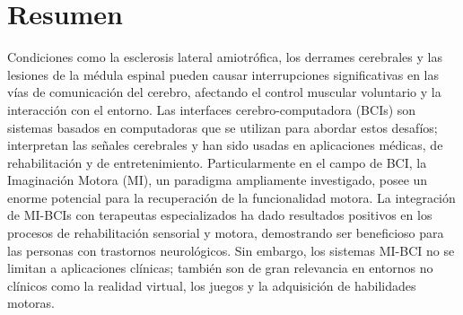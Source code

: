 \newpage
\chapter*{\sffamily Resumen}
%
\par Condiciones como la esclerosis lateral amiotrófica, los derrames cerebrales y las lesiones de la médula espinal pueden causar interrupciones significativas en las vías de comunicación del cerebro, afectando el control muscular voluntario y la interacción con el entorno. Las interfaces cerebro-computadora (BCIs) son sistemas basados en computadoras que se utilizan para abordar estos desafíos; interpretan las señales cerebrales y han sido usadas en aplicaciones médicas, de rehabilitación y de entretenimiento. Particularmente en el campo de BCI, la Imaginación Motora (MI), un paradigma ampliamente investigado, posee un enorme potencial para la recuperación de la funcionalidad motora. La integración de MI-BCIs con terapeutas especializados ha dado resultados positivos en los procesos de rehabilitación sensorial y motora, demostrando ser beneficioso para las personas con trastornos neurológicos. Sin embargo, los sistemas MI-BCI no se limitan a aplicaciones clínicas; también son de gran relevancia en entornos no clínicos como la realidad virtual, los juegos y la adquisición de habilidades motoras.

